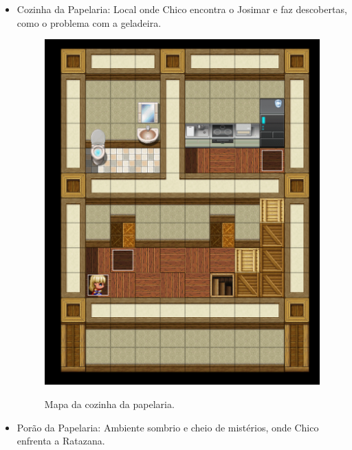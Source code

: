 \begin{itemize}
	\item Cozinha da Papelaria: Local onde Chico encontra o Josimar e faz descobertas, como o problema com a geladeira.

	      \begin{figure}[ht]
		      \centering
		      \caption{Mapa da cozinha da papelaria.}
		      \includegraphics[scale=0.5]{Textuais/Pictures/Cozinha_papelaria.png}
		      \label{fig:lanchonete}
	      \end{figure}

	\item Porão da Papelaria: Ambiente sombrio e cheio de mistérios, onde Chico enfrenta a Ratazana.


\end{itemize}

